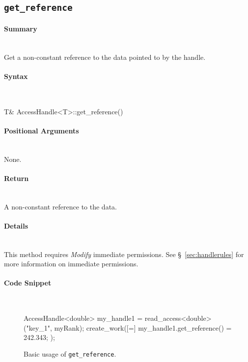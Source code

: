 \subsection{\texttt{get\_reference}}

\paragraph{Summary}\mbox{}\\
Get a non-constant reference to the data pointed to by the handle.

\paragraph{Syntax}\mbox{}\\
\begin{CppCode}
T& AccessHandle<T>::get_reference()
\end{CppCode}

\paragraph{Positional Arguments}\mbox{}\\
None.

\paragraph{Return}\mbox{}\\
A non-constant reference to the data.  

\paragraph{Details}\mbox{}\\
This method requires {\it Modify} immediate permissions.  See
\S~\ref{sec:handlerules} for more information on immediate permissions.

\paragraph{Code Snippet}\mbox{}\\
\begin{figure}[!h]
\begin{CppCodeNumb}
AccessHandle<double> my_handle1 = read_access<double>("key_1", myRank);
create_work([=]{
  my_handle1.get_reference() = 242.343;
});
\end{CppCodeNumb}
\label{fig:fe_api_getreference}
\caption{Basic usage of \texttt{get\_reference}.}
\end{figure}

